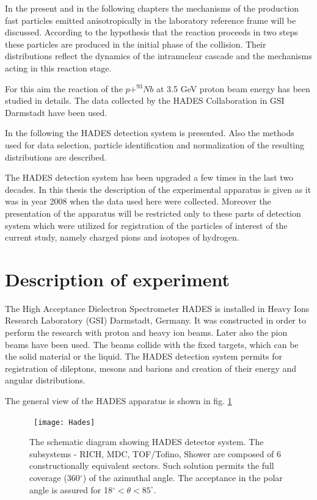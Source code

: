 In the present and in the following chapters the mechanisms of the production fast particles emitted anisotropically in the laboratory reference frame will be discussed.
According to the hypothesis that the reaction proceeds in two steps these particles are produced in the initial phase of the collision. 
Their distributions reflect the dynamics of the intranuclear cascade and the mechanisms acting in this reaction stage.

For this aim the reaction of the $p + ^{93}Nb$ at 3.5 GeV proton beam energy has been studied in details. 
The data collected by the HADES Collaboration \cite{AGAKISHIEV2012304,AgakishievPionP,
PhysRevC.90.054906,HADES_2014_Lambda_p_Nb,PhysRevLett.114.212301,
PhysRevC.94.025201,HADES_2014_Lambda_p_Nb,2018735} 
in GSI Darmstadt have been used.

In the following the HADES detection system is presented. Also the methods used for data selection, particle identification and normalization of the 
resulting distributions are described. 

The HADES detection system has been upgraded a few times in the last two decades. In this thesis the description of the experimental apparatus is given 
as it was in year 2008 when the data used here were collected. Moreover the presentation of the apparatus will be restricted only 
to these parts of detection system which were utilized for registration of the particles of interest of the current study, namely charged pions and isotopes of hydrogen.

\section{Description of experiment}

The High Acceptance Dielectron Spectrometer HADES is installed in Heavy Ions Research Laboratory 
(GSI) Darmstadt, Germany.
It was constructed in order to perform the research with proton and heavy ion beams. 
Later also the pion beams have been used.
The beams collide with the fixed targets, which can be the solid material or the liquid.
The HADES detection system permits for registration of dileptons, mesons and barions  
and creation of their energy and angular distributions. 

The general view of the HADES apparatus is shown in fig. \ref{Hades}

\begin{figure}[!h]
	\centering\
	\texttt{[image: Hades]}
	\caption{The schematic diagram showing HADES detector system.
	The subsystems - RICH, MDC, TOF/Tofino, Shower are composed of 6 constructionally 
	equivalent sectors. 
Such solution permits the full coverage (360$^{\circ}$) of the azimuthal angle.
The acceptance in the polar angle is assured for 18$^{\circ} < \theta < 85^{\circ}$.}
	\label{Hades}
\end{figure}

